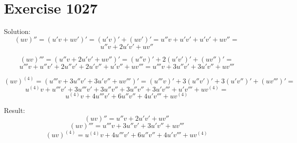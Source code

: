 \documentclass[a4paper, 10pt]{scrartcl}
\begin{document}
\section{Exercise 1027}

Solution:
\[
(uv)'' = (u'v + uv')' = (u'v)' + (uv')' = u''v + u'v' + u'v' + uv'' =
\]
\[
u''v + 2u'v' + uv''
\]

\[
(uv)''' = (u''v + 2u'v' + uv'')' = (u''v)' + 2(u'v')' + (uv'')' =
\]
\[
u'''v + u''v' + 2u''v' + 2u'v'' + u'v'' + uv''' = u'''v + 3u''v' + 3u'v'' + uv'''
\]

\[
(uv)^{(4)} = (u'''v + 3u''v' + 3u'v'' + uv''')' = (u'''v)' + 3(u''v')' + 3(u'v'')' + (uv''')' =
\]
\[
u^{(4)}v + u'''v' + 3u'''v' + 3u''v'' + 3u''v'' + 3u'v''' + u'v''' + uv^{(4)} =
\]
\[
u^{(4)}v + 4u'''v' + 6u''v'' + 4u'v''' + uv^{(4)}
\]

Result:
\[
(uv)'' = u''v + 2u'v' + uv''
\]
\[
(uv)''' = u'''v + 3u''v' + 3u'v'' + uv'''
\]
\[
(uv)^{(4)} = u^{(4)}v + 4u'''v' + 6u''v'' + 4u'v''' + uv^{(4)}
\]
\end{document}

